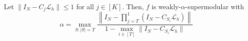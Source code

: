 \documentclass[12pt]{article}
\begin{document}
\begin{proposition} \label{th:generalmonotonicity}
    Let $\|I_N - C_j\mathcal{L}_h\| \leq 1$ for all $j \in [K]$. Then, $f$ is weakly-$\alpha$-supermodular with $$\alpha = \max_{S: |S| = T}\frac{\left\|I_N - \prod_{j = T}^{1}\left(I_N - C_{S_i}\mathcal{L}_h\right)\right\|}{1 - \max_{i \in [T]}\|I_N - C_{S_i}\mathcal{L}_h\| }$$ 
\end{proposition}


\begin{corollary}
    
\end{corollary}








\end{document}
